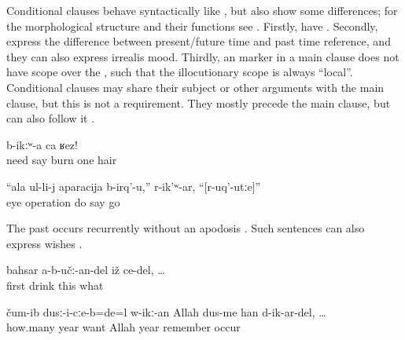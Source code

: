 Conditional clauses behave syntactically like , but also show some differences; for the morphological structure and their functions see . Firstly,  have . Secondly,  express the difference between present/future time and past time reference, and they can also express irrealis mood. Thirdly, an  marker in a main clause does not have scope over the  , such that the illocutionary scope is always ``local''. Conditional clauses may share their subject or other arguments with the main clause, but this is not a requirement. They mostly precede the main clause, but can also follow it .
%
\begin{exe}
	\ex	\label{ex:‎‎‎If you need me, burn one hair}
		b-ikːʷ-a	ca	ʁez!\\
			need	say	burn	one	hair\\
	\glt	{}

	\ex	\label{ex:‎‎‎(They) will operate your eye, she said, if you go (to the doctor)}
	\gll	``ala	ul-li-j	aparacija	b-irq'-u,''	r-ik'ʷ-ar,	``[r-uq'-utːe]''\\
			eye	operation	do	\tsc{f-}say	go\\
	\glt	{}
\end{exe}

The past  occurs recurrently without an apodosis . Such sentences can also express wishes .
%
\begin{exe}
	\ex	\label{ex:‎if he did not drink first}
	\gll	bahsar	a-b-učː-an-del	iž	ce-del, \ldots	\\
		first	drink	this	what\\
	\glt	{}

	\ex	\label{ex:‎‎‎In which year it was, beloved Allah, if I would remember the years}
	\gll	čum-ib	dusː-i-cːe-b=de=l	w-ikː-an	Allah	dus-me	han	d-ik-ar-del, \ldots\\
		how.many	year	want	Allah	year	remember	occur\\
	\glt	{}
\end{exe}

